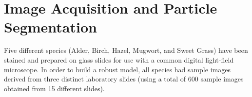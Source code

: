 \section{Image Acquisition and Particle Segmentation}

Five different species (Alder, Birch, Hazel, Mugwort, and Sweet Grass) have been stained and prepared on glass slides for use with a common digital light-field microscope. In order to build a robust model, all species had sample images derived from three distinct laboratory slides (using a total of 600 sample images obtained from 15 different slides).
  
  
  
  
  
  